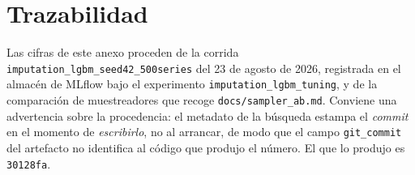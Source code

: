 \section{Trazabilidad}

Las cifras de este anexo proceden de la corrida \texttt{imputation\_}\allowbreak\texttt{lgbm\_}\allowbreak\texttt{seed42\_}\allowbreak\texttt{500series} del
23 de agosto de 2026, registrada en el almacén de MLflow bajo el experimento
\texttt{imputation\_}\allowbreak\texttt{lgbm\_}\allowbreak\texttt{tuning}, y de la comparación de muestreadores que recoge
\texttt{docs/}\allowbreak\texttt{sampler\_ab.md}. Conviene una advertencia sobre la procedencia: el metadato de la
búsqueda estampa el \textit{commit} en el momento de \emph{escribirlo}, no al arrancar, de modo
que el campo \texttt{git\_commit} del artefacto no identifica al código que produjo el número. El
que lo produjo es \texttt{30128fa}.
